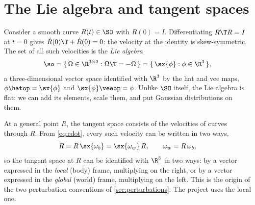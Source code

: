 \section{The Lie algebra and tangent spaces}

Consider a smooth curve $R(t) \in \SO$ with $R(0) = I$. Differentiating $R\T R = I$ at $t = 0$ gives
$\dot R(0)\T + \dot R(0) = 0$: the velocity at the identity is skew-symmetric. The set of all such
velocities is the \emph{Lie algebra}
\begin{equation}
  \so = \{\, \Omega \in \R^{3\times3} : \Omega\T = -\Omega \,\} = \{\, \sx{\phi} : \phi \in \R^3 \,\},
\end{equation}
a three-dimensional vector space identified with $\R^3$ by the hat and vee maps,
$\phi\hatop = \sx{\phi}$ and $\sx{\phi}\veeop = \phi$. Unlike $\SO$ itself, the Lie algebra is flat:
we can add its elements, scale them, and put Gaussian distributions on them.

At a general point $R$, the tangent space consists of the velocities of curves through $R$. From
\eqref{eq:rdot}, every such velocity can be written in two ways,
\begin{equation}
  \dot R = R\,\sx{\omega_b} = \sx{\omega_w}\,R, \qquad \omega_w = R\,\omega_b,
\end{equation}
so the tangent space at $R$ can be identified with $\R^3$ in two ways: by a vector expressed in the
\emph{local} (body) frame, multiplying on the right, or by a vector expressed in the \emph{global}
(world) frame, multiplying on the left. This is the origin of the two perturbation conventions of
\cref{sec:perturbations}. The project uses the local one.

